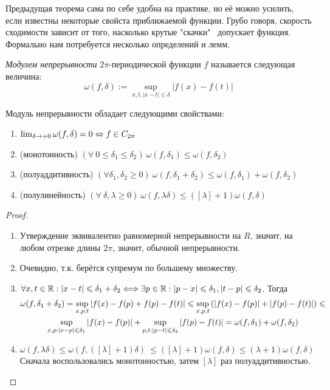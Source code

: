 \begin{note}
	Предыдущая теорема сама по себе удобна на практике, но её можно усилить, если известны некоторые свойста приближаемой функции. Грубо говоря, скорость сходимости зависит от того, насколько крутые "скачки" \ допускает функция. Формально нам потребуется несколько определений и лемм.
\end{note}

\begin{definition}
	\textit{Модулем непрерывности} $2\pi$-периодической функции $f$ называется следующая величина:
	\[
		\omega(f, \delta) := \sup_{x, t, |x - t| \leq \delta} |f(x) - f(t)|
	\]
\end{definition}

\begin{theorem}
	Модуль непрерывности обладает следующими свойствами:
	\begin{enumerate}
	\item
		$\lim_{\delta \to +0} \omega(f, \delta) = 0 \Leftrightarrow f \in C_{2\pi}$
	\item (монотонность)
		$(\forall \ 0 \leq \delta_1 \leq \delta_2) \ \omega(f, \delta_1) \leq \omega(f, \delta_2)$
	\item (полуаддитивность)
		$(\forall \delta_1, \delta_2 \geq 0) \ \omega(f, \delta_1 + \delta_2) \leq \omega(f, \delta_1) + \omega(f, \delta_2)$
	\item (полулинейность)
		$(\forall \ \delta, \lambda \geq 0) \ \omega(f, \lambda\delta) \leq ([\lambda] + 1)\omega(f, \delta)$
	\end{enumerate}
\end{theorem}

\begin{proof}
	\begin{enumerate}
	\item
		Утверждение эквивалентно равномерной непрерывности на $R$, значит, на любом отрезке длины $2\pi$, значит, обычной непрерывности. 
	\item
		Очевидно, т.к. берётся супремум по большему множеству.
	\item
		$\forall x, t \in \mathbb{R} : |x - t| \leqslant \delta_1 + \delta_2 \Longleftrightarrow \exists p \in \mathbb{R} : |p - x| \leqslant \delta_1, |t - p| \leqslant \delta_2$. Тогда
		\begin{multline*}
			\omega(f, \delta_1 + \delta_2) = \sup_{x,p,t}|f(x) - f(p) + f(p) - f(t)| \leqslant \sup_{x,p,t}\left(|f(x) - f(p)| + |f(p) - f(t)|\right) \leqslant \\ \sup_{x,p:|x - p| \leqslant \delta_1}|f(x) - f(p)| + \sup_{p,t:|p - t| \leqslant \delta_2}|f(p) - f(t)| = \omega(f, \delta_1) + \omega(f, \delta_2)
		\end{multline*}
	\item
		$\omega(f, \lambda\delta) \leq \omega(f, ([\lambda] + 1)\delta) \ \leq ([\lambda] + 1)\omega(f, \delta) \leq (\lambda + 1)\omega(f, \delta)$ \\
		Сначала воспользовались монотонностью, затем $[\lambda]$ раз полуаддитивностью.
	\end{enumerate}
\end{proof}

